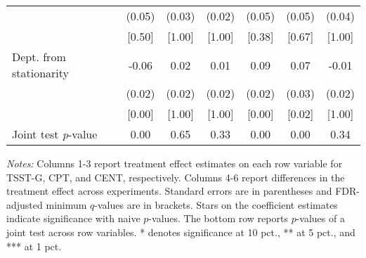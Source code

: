 \begin{table}[htbp]
{\begin{threeparttable}
\begin{tabular}{l*{6}{c}}
          &   (0.05)&   (0.03)&   (0.02)&   (0.05)&   (0.05)&   (0.04)\\
          &   [0.50]&   [1.00]&   [1.00]&   [0.38]&   [0.67]&   [1.00]\\
Dept. from stationarity&-0.06\sym{***}&     0.02&     0.01&0.09\sym{***}&0.07\sym{***}&    -0.01\\
          &   (0.02)&   (0.02)&   (0.02)&   (0.02)&   (0.03)&   (0.02)\\
          &[0.00\sym{***}]&   [1.00]&   [1.00]&[0.00\sym{***}]&[0.02\sym{**}]&   [1.00]\\
\midrule Joint test \emph{p}-value&0.00\sym{***}&     0.65&     0.33&0.00\sym{***}&0.00\sym{***}&     0.34\\
\bottomrule \end{tabular} \begin{tablenotes}[flushleft] \footnotesize \item \emph{Notes:} Columns 1-3 report treatment effect estimates on each row variable for TSST-G, CPT, and CENT, respectively. Columns 4-6 report differences in the treatment effect across experiments. Standard errors are in parentheses and FDR-adjusted minimum \(q\)-values are in brackets. Stars on the coefficient estimates indicate significance with naive \(p\)-values. The bottom row reports \(p\)-values of a joint test across row variables. * denotes significance at 10 pct., ** at 5 pct., and *** at 1 pct. \end{tablenotes} \end{threeparttable} } \end{table}
